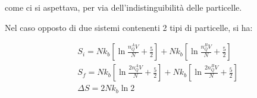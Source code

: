 \documentclass{article}
\begin{document}
come ci si aspettava, per via dell'indistinguibilità delle particelle.

Nel caso opposto di due sistemi contenenti 2 tipi di particelle, si ha:

\begin{equation}
    \begin{aligned}
         & S_i=Nk_b\left[\ln{\frac{n_Q^AV}{N}}+\frac{5}{2}\right]+Nk_b\left[\ln{\frac{n_Q^BV}{N}}+\frac{5}{2}\right]    \\
         & S_f= Nk_b\left[\ln{\frac{2n_Q^AV}{N}}+\frac{5}{2}\right]+Nk_b\left[\ln{\frac{2n_Q^BV}{N}}+\frac{5}{2}\right] \\
         & \Delta S=2Nk_b\ln{2}
    \end{aligned}
\end{equation}
\end{document}
